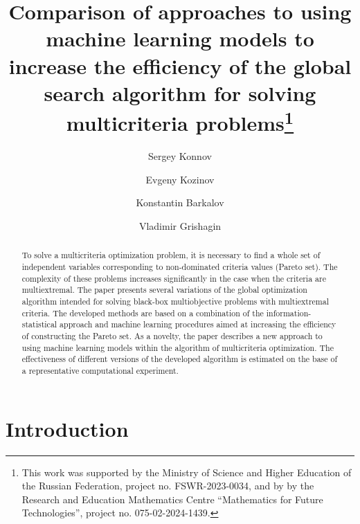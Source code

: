 \documentclass[runningheads]{llncs}
\begin{document}
%
\title{Comparison of approaches to using machine learning models to increase the efficiency of the global search algorithm for solving multicriteria problems\thanks{This work was supported by the Ministry of Science and Higher Education of the Russian Federation, project no. FSWR-2023-0034, and by by the Research and Education Mathematics Centre ``Mathematics for Future Technologies'', project no. 075-02-2024-1439.} }
%
%
\author{Sergey Konnov \and
Evgeny Kozinov \Letter{} \and
Konstantin Barkalov \Letter{} \and
Vladimir Grishagin}
%

%
\maketitle

%
\begin{abstract}
To solve a multicriteria optimization problem, it is necessary to find a whole set of independent variables corresponding to non-dominated criteria values (Pareto set). The complexity of these problems increases significantly in the case when the criteria are multiextremal. The paper presents several variations of the global optimization algorithm intended for solving black-box multiobjective problems with multiextremal criteria. The developed methods are based on a combination of the information-statistical approach and machine learning procedures aimed at increasing the efficiency of constructing the Pareto set. As a novelty, the paper describes a new approach to using machine learning models within the algorithm of multicriteria optimization. The effectiveness of different versions of the developed algorithm is estimated on the base of  a representative computational experiment.

\end{abstract}
%
%
%
\section{Introduction}
\label{sec:1}
\end{document}
